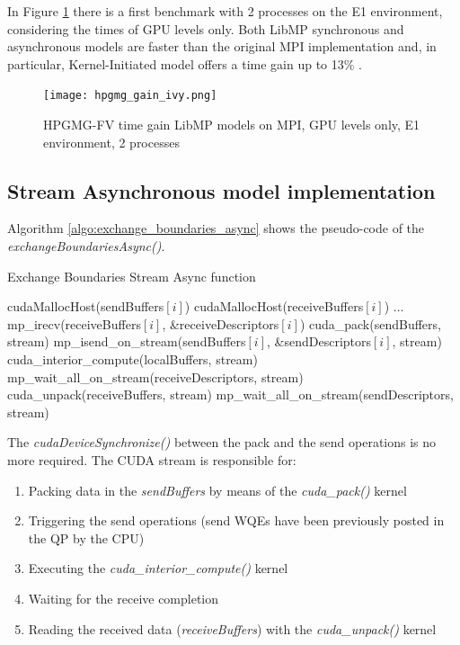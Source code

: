 \documentclass[review]{siamart1116}
\begin{document}
In Figure \ref{fig:hpgmg_gai_ivy} there is
a first benchmark with 2 processes on the E1 environment, considering
the times of GPU levels only. Both LibMP synchronous and asynchronous
models are faster than the original MPI implementation and, in particular,
Kernel-Initiated model offers a time gain up to 13\% .

\begin{figure}[h]
\centering
\texttt{[image: hpgmg\_gain\_ivy.png]}
\caption{HPGMG-FV time gain LibMP models on MPI, GPU levels only, E1 environment, 2 processes}
\label{fig:hpgmg_gai_ivy}
\end{figure}

\subsection{Stream Asynchronous model implementation}\label{sec:sahpgmg}

Algorithm \ref{algo:exchange_boundaries_async} shows the pseudo-code
of the \textit{exchangeBoundariesAsync()}.

\begin{algorithm}
\small
\caption{Exchange Boundaries Stream Async function}
\label{algo:exchange_boundaries_async}
\begin{algorithmic}[1]
\State cudaMallocHost(sendBuffers$[i]$)
\State cudaMallocHost(receiveBuffers$[i]$)
\EndFor
\State ...
 \label{alg:a}
                \State mp\_irecv(receiveBuffers$[i]$, \&receiveDescriptors$[i]$)
        \EndFor
        \State cuda\_pack(sendBuffers, stream)
                \State mp\_isend\_on\_stream(sendBuffers$[i]$, \&sendDescriptors$[i]$, stream)
        \EndFor
        \State cuda\_interior\_compute(localBuffers, stream)
        \State mp\_wait\_all\_on\_stream(receiveDescriptors, stream)
        \State cuda\_unpack(receiveBuffers, stream)
        \State mp\_wait\_all\_on\_stream(sendDescriptors, stream)
\EndFunction
\end{algorithmic}
\end{algorithm}

The \textit{cudaDeviceSynchronize()} between the pack and the send operations is no more required. The CUDA stream is responsible for:

\begin{enumerate}
\item Packing data in the \textit{sendBuffers} by means of the \textit{cuda\_pack()} kernel
\item Triggering the send operations (send WQEs have been previously posted in the QP by the CPU)
\item Executing the \textit{cuda\_interior\_compute()} kernel
\item Waiting for the receive completion
\item Reading the received data (\textit{receiveBuffers}) with the \textit{cuda\_unpack()} kernel
\end{enumerate}
\end{document}
